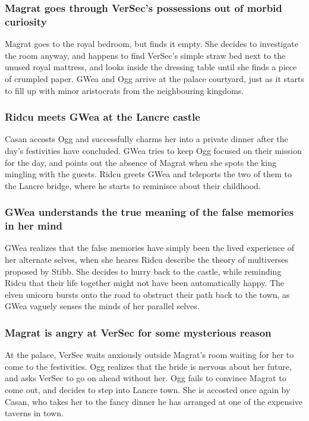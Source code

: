 \subsubsection{\Gls{Magrat} goes through \Gls{VerSec}'s possessions out of morbid curiosity}
\Gls{Magrat} goes to the royal bedroom, but finds it empty. She decides to investigate the room
anyway, and happens to find \Gls{VerSec}'s simple straw bed next to the unused royal mattress, and
looks inside the dressing table until she finds a piece of crumpled paper. \Gls{GWea} and \Gls{Ogg}
arrive at the palace courtyard, just as it starts to fill up with minor aristocrats from the
neighbouring kingdoms.

\subsubsection{\Gls{Ridcu} meets \Gls{GWea} at the Lancre castle}
\Gls{Casan} accosts \Gls{Ogg} and successfully charms her into a private dinner after the day's
festivities have concluded. \Gls{GWea} tries to keep \Gls{Ogg} focused on their mission for the
day, and points out the absence of \Gls{Magrat} when she spots the king mingling with the guests.
\Gls{Ridcu} greets \Gls{GWea} and teleports the two of them to the Lancre bridge, where he starts to
reminisce about their childhood.

\subsubsection{\Gls{GWea} understands the true meaning of the false memories in her mind}
\Gls{GWea} realizes that the false memories have simply been the lived experience of her alternate
selves, when she heares \Gls{Ridcu} describe the theory of multiverses proposed by \Gls{Stibb}. She
decides to hurry back to the castle, while reminding \Gls{Ridcu} that their life together might not
have been automatically happy. The elven unicorn bursts onto the road to obstruct their path back
to the town, as \Gls{GWea} vaguely senses the minds of her parallel selves.

\subsubsection{\Gls{Magrat} is angry at \Gls{VerSec} for some mysterious reason}
At the palace, \Gls{VerSec} waits anxiously outside \Gls{Magrat}'s room waiting for her to come to
the festivities. \Gls{Ogg} realizes that the bride is nervous about her future, and asks
\Gls{VerSec} to go on ahead without her. \Gls{Ogg} fails to convince \Gls{Magrat} to come out, and
decides to step into Lancre town. She is accosted once again by \Gls{Casan}, who takes her to the
fancy dinner he has arranged at one of the expensive taverns in town.

